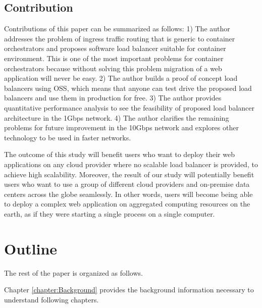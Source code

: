 \subsection{Contribution}

Contributions of this paper can be summarized as follows:
1) The author addresses the problem of ingress traffic routing that is generic to container orchestrators and proposes software load balancer suitable for container environment.
This is one of the most important problems for container orchestrators because without solving this problem migration of a web application will never be easy.
2) The author builds a proof of concept load balancers using OSS, which means that anyone can test drive the proposed load balancers and use them in production for free.
3) The author provides quantitative performance analysis to see the feasibility of proposed load balancer architecture in the 1Gbps network.
4) The author clarifies the remaining problems for future improvement in the 10Gbps network and explores other technology to be used in faster networks.

The outcome of this study will benefit users who want to deploy their web applications on any cloud provider where no scalable load balancer is provided, to achieve high scalability.
Moreover, the result of our study will potentially benefit users who want to use a group of different cloud providers and on-premise data centers across the globe seamlessly.
In other words, users will become being able to deploy a complex web application on aggregated computing resources on the earth, as if they were starting a single process on a single computer.

\section{Outline}

The rest of the paper is organized as follows.

Chapter \ref{chapter:Background} provides the background information necessary to understand following chapters.

